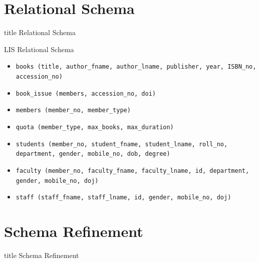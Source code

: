\documentclass[aspectratio=169, xcolor=dvipsnames]{beamer}
\begin{document}
\section{Relational Schema}
\begin{frame}
  \vfill
  \centering
  \begin{beamercolorbox}[sep=8pt,center,shadow=true,rounded=true]{title}
    Relational Schema\par%
  \end{beamercolorbox}
  \vfill
\end{frame}

\begin{frame}{LIS Relational Schema}
    \begin{itemize}[<+->]
        \item \texttt{books (title, author\_fname, author\_lname, publisher, year, ISBN\_no, accession\_no)}
        \item \texttt{book\_issue (members, accession\_no, doi)}
        \item \texttt{members (member\_no, member\_type)}
        \item \texttt{quota (member\_type, max\_books, max\_duration)}
        \item \texttt{students (member\_no, student\_fname, student\_lname, roll\_no, department, gender, mobile\_no, dob, degree)}
        \item \texttt{faculty (member\_no, faculty\_fname, faculty\_lname, id, department, gender, mobile\_no, doj)}
        \item \texttt{staff (staff\_fname, staff\_lname, id, gender, mobile\_no, doj)}
    \end{itemize}
\end{frame}

\section{Schema Refinement}
\begin{frame}
  \vfill
  \centering
  \begin{beamercolorbox}[sep=8pt,center,shadow=true,rounded=true]{title}
    Schema Refinement\par%
  \end{beamercolorbox}
  \vfill
\end{frame}
\end{document}
